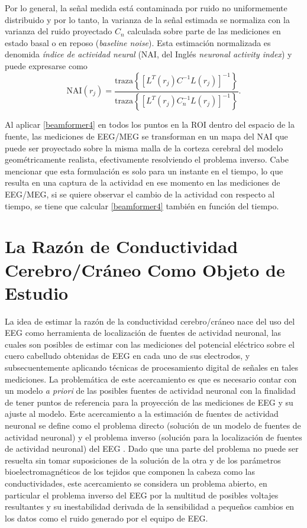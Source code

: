 Por lo general, la señal medida está contaminada por ruido no uniformemente distribuido y por lo tanto, la varianza de la señal estimada se normaliza con la varianza del ruido proyectado $C_n$ calculada sobre parte de las mediciones en estado basal o en reposo (\emph{baseline noise}).
Esta estimación normalizada es denomida \emph{índice de actividad neural} (NAI, del Inglés \emph{neuronal activity index}) \cite{VanVeen1997} y puede expresarse como
\begin{equation}
	\label{beamformer4}
	\text{NAI}(r_j) = \frac{\text{traza}\left\{[L^{T}(r_j)C^{-1}L(r_j)]^{-1}\right\}}{\text{traza}\left\{[L^{T}(r_j)C_n^{-1}L(r_j)]^{-1}\right\}} \text{.}
\end{equation}

Al aplicar \cref{beamformer4} en todos los puntos en la ROI dentro del espacio de la fuente, las mediciones de EEG/MEG se transforman en un mapa del NAI que puede ser proyectado sobre la misma malla de la corteza cerebral del modelo geométricamente realista, efectivamente resolviendo el problema inverso.
Cabe mencionar que esta formulación es solo para un instante en el tiempo, lo que resulta en una captura de la actividad en ese momento en las mediciones de EEG/MEG, si se quiere observar el cambio de la actividad con respecto al tiempo, se tiene que calcular \cref{beamformer4} también en función del tiempo.

\section{La Razón de Conductividad Cerebro/Cráneo Como Objeto de Estudio}
\label{sec:intro:study}

La idea de estimar la razón de la conductividad cerebro/cráneo nace del uso del EEG como herramienta de localización de fuentes de actividad neuronal, las cuales son posibles de estimar con las mediciones del potencial eléctrico sobre el cuero cabelludo obtenidas de EEG en cada uno de sus electrodos, y subsecuentemente aplicando técnicas de procesamiento digital de señales en tales mediciones.
La problemática de este acercamiento es que es necesario contar con un modelo \emph{a priori} de las posibles fuentes de actividad neuronal con la finalidad de tener puntos de referencia para la proyección de las mediciones de EEG y su ajuste al modelo.
Este acercamiento a la estimación de fuentes de actividad neuronal se define como el problema directo (solución de un modelo de fuentes de actividad neuronal) y el problema inverso (solución para la localización de fuentes de actividad neuronal) del EEG \cite{Hallez2007}.
Dado que una parte del problema no puede ser resuelta sin tomar suposiciones de la solución de la otra y de los parámetros bioelectromagnéticos de los tejidos que componen la cabeza como las conductividades, este acercamiento se considera un problema abierto, en particular el problema inverso del EEG por la multitud de posibles voltajes resultantes y su inestabilidad derivada de la sensibilidad a pequeños cambios en los datos como el ruido generado por el equipo de EEG.

